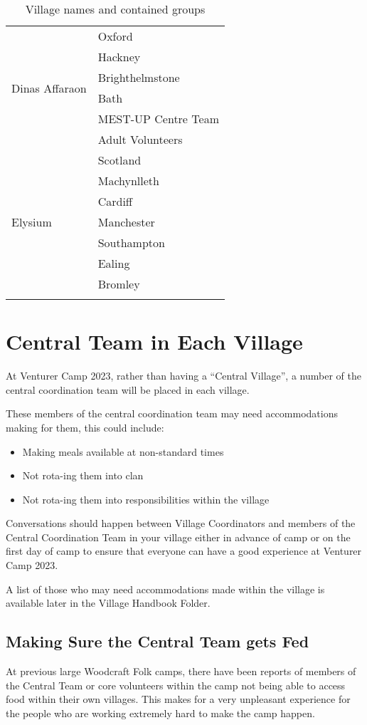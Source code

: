 \documentclass[a4paper, 11pt]{report}
\begin{document}
{\begin{longtable}{p{} p{}}
        \multirow{6}{*}{Dinas Affaraon} & Oxford\\*
        & Hackney \\*
        & Brighthelmstone \\*
        & Bath \\*
        & MEST-UP Centre Team \\*
        & Adult Volunteers \\
        \hline

        \multirow{7}{*}{Elysium} & Scotland\\*
        & Machynlleth \\*
        & Cardiff \\*
        & Manchester \\*
        & Southampton \\*
        & Ealing \\*
        & Bromley \\
        \hline

\caption{Village names and contained groups}
\end{longtable}
}

\section{Central Team in Each Village}
At Venturer Camp 2023, rather than having a ``Central Village'', a number of the central coordination team will be placed in each village.\nl

These members of the central coordination team may need accommodations making for them, this could include:
\begin{itemize}
    \item Making meals available at non-standard times
    \item Not rota-ing them into clan
    \item Not rota-ing them into responsibilities within the village
\end{itemize}
Conversations should happen between Village Coordinators and members of the Central Coordination Team in your village either in advance of camp or on the first day of camp to ensure that everyone can have a good experience at Venturer Camp 2023.\nl

A list of those who may need accommodations made within the village is available later in the Village Handbook Folder.

\subsection{Making Sure the Central Team gets Fed}
At previous large Woodcraft Folk camps, there have been reports of members of the Central Team or core volunteers within the camp not being able to access food within their own villages. This makes for a very unpleasant experience for the people who are working extremely hard to make the camp happen.\nl
\end{document}
